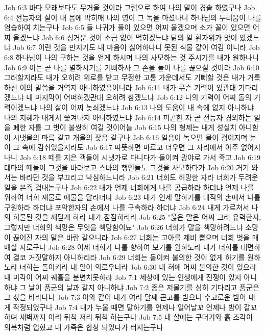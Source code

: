 Job 6:3  바다 모래보다도 무거울 것이라 그럼으로 하여 나의 말이 경솔 하였구나
Job 6:4  전능자의 살이 내 몸에 박히매 나의 영이 그 독을 마셨나니 하나님의 두려움이 나를 엄습하여 치는구나
Job 6:5  들 나귀가 풀이 있으면 어찌 울겠으며 소가 꼴이 있으면 어찌 울겠느냐
Job 6:6  싱거운 것이 소금 없이 먹히겠느냐 닭의 알 흰자위가 맛이 있겠느냐
Job 6:7  이런 것을 만지기도 내 마음이 싫어하나니 못된 식물 같이 여김 이니라
Job 6:8  하나님이 나의 구하는 것을 얻게 하시며 나의 사모하는 것 주시기를 내가 원하나니
Job 6:9  이는 곧 나를 멸하시기를 기뻐하사 그 손을 들어 나를 끊으실 것이라
Job 6:10  그러할지라도 내가 오히려 위로를 받고 무정한 고통 가운데서도 기뻐할 것은 내가 거룩하신 이의 말씀을 거역지 아니하였음이니라
Job 6:11  내가 무슨 기력이 있관대 기다리겠느냐 내 마지막이 어떠하겠관대 오히려 참겠느냐
Job 6:12  나의 기력이 어찌 돌의 기력이겠느냐 나의 살이 어찌 놋쇠겠느냐
Job 6:13  나의 도움이 내 속에 없지 아니하냐 나의 지혜가 내게서 쫓겨나지 아니하였느냐
Job 6:14  피곤한 자 곧 전능자 경외하는 일을 폐한 자를 그 벗이 불쌍히 여길 것이어늘
Job 6:15  나의 형제는 내게 성실치 아니함이 시냇물의 마름 같고 개울의 잦음 같구나
Job 6:16  얼음이 녹으면 물이 검어지며 눈이 그 속에 감취었을지라도
Job 6:17  따뜻하면 마르고 더우면 그 자리에서 아주 없어지나니
Job 6:18  떼를 지은 객들이 시냇가로 다니다가 돌이켜 광야로 가서 죽고
Job 6:19  데마의 떼들이 그것을 바라보고 스바의 행인들도 그것을 사모하다가
Job 6:20  거기 와서는 바라던 것을 부끄리고 낙심하느니라
Job 6:21  너희도 허망한 자라 너희가 두려운 일을 본즉 겁내는구나
Job 6:22  내가 언제 너희에게 나를 공급하라 하더냐 언제 나를 위하여 너희 재물로 예물을 달라더냐
Job 6:23  내가 언제 말하기를 대적의 손에서 나를 구원하라 하더냐 포악한자의 손에서 나를 구속하라 하더냐
Job 6:24  내게 가르쳐서 나의 허물된 것을 깨닫게 하라 내가 잠잠하리라
Job 6:25  "옳은 말은 어찌 그리 유력한지, 그렇지만 너희의 책망은 무엇을 책망함이뇨"
Job 6:26  너희가 말을 책망하려느냐 소망이 끊어진 자의 말은 바람 같으니라
Job 6:27  너희는 고아를 제비 뽑으며 너희 벗을 매매할 자로구나
Job 6:28  이제 너희가 나를 향하여 보기를 원하노라 내가 너희를 대면하여 결코 거짓말하지 아니하리라
Job 6:29  너희는 돌이켜 불의한 것이 없게 하기를 원하노라 너희는 돌이키라 내 일이 의로우니라
Job 6:30  내 혀에 어찌 불의한 것이 있으랴 내 미각이 어찌 궤휼을 분변치못하랴
Job 7:1  세상에 있는 인생에게 전쟁이 있지 아니하냐 그 날이 품군의 날과 같지 아니하냐
Job 7:2  종은 저물기를 심히 기다리고 품군은 그 삯을 바라나니
Job 7:3  이와 같이 내가 여러 달째 곤고를 받으니 수고로운 밤이 내게 작정되었구나
Job 7:4  내가 누울 때면 말하기를 언제나 일어날꼬 언제나 밤이 갈꼬 하며 새벽까지 이리 뒤척 저리 뒤척 하는구나
Job 7:5  내 살에는 구더기와 흙 조각이 의복처럼 입혔고 내 가죽은 합창 되었다가 터지는구나
